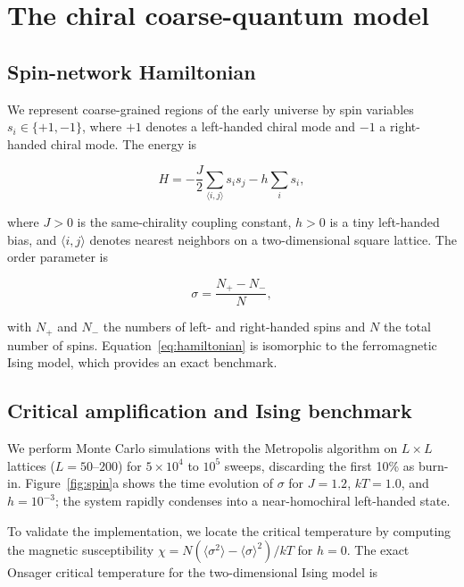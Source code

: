 \documentclass[twocolumn,11pt,a4paper]{article}
\begin{document}
\section{The chiral coarse-quantum model}
\label{sec:model}

\subsection{Spin-network Hamiltonian}

We represent coarse-grained regions of the early universe by spin variables $s_i \in \{+1, -1\}$, where $+1$ denotes a left-handed chiral mode and $-1$ a right-handed chiral mode. The energy is

\begin{equation}
H = -\frac{J}{2}\sum_{\langle i,j\rangle} s_i s_j - h\sum_i s_i,
\label{eq:hamiltonian}
\end{equation}

where $J > 0$ is the same-chirality coupling constant, $h > 0$ is a tiny left-handed bias, and $\langle i,j\rangle$ denotes nearest neighbors on a two-dimensional square lattice. The order parameter is

\begin{equation}
\sigma = \frac{N_{+} - N_{-}}{N},
\label{eq:order}
\end{equation}

with $N_{+}$ and $N_{-}$ the numbers of left- and right-handed spins and $N$ the total number of spins. Equation~\eqref{eq:hamiltonian} is isomorphic to the ferromagnetic Ising model, which provides an exact benchmark.

\subsection{Critical amplification and Ising benchmark}

We perform Monte Carlo simulations with the Metropolis algorithm on $L \times L$ lattices ($L = 50$--$200$) for $5\times10^4$ to $10^5$ sweeps, discarding the first 10\% as burn-in. Figure~\ref{fig:spin}a shows the time evolution of $\sigma$ for $J = 1.2$, $kT = 1.0$, and $h = 10^{-3}$; the system rapidly condenses into a near-homochiral left-handed state.

To validate the implementation, we locate the critical temperature by computing the magnetic susceptibility $\chi = N(\langle\sigma^2\rangle - \langle\sigma\rangle^2)/kT$ for $h = 0$. The exact Onsager critical temperature for the two-dimensional Ising model is
\end{document}
